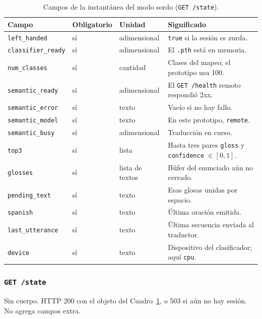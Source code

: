 \begin{table}[H]
  \centering
  \caption{Campos de la instantánea del modo sordo (\texttt{GET /state}).}
  \label{tab:api-local-snapshot}
  \small
  \begin{tabularx}{\textwidth}{@{}>{\raggedright\arraybackslash}p{3.4cm} l l >{\raggedright\arraybackslash}X@{}}
    \toprule
    \textbf{Campo} & \textbf{Obligatorio} & \textbf{Unidad} & \textbf{Significado} \\
    \midrule
    \texttt{left\_handed} & sí & adimensional & \texttt{true} si la sesión es zurda. \\
    \texttt{classifier\_ready} & sí & adimensional & El \texttt{.pth} está en memoria. \\
    \texttt{num\_classes} & sí & cantidad & Clases del mapeo; el prototipo usa 100. \\
    \texttt{semantic\_ready} & sí & adimensional & El \texttt{GET /health} remoto respondió 2xx. \\
    \texttt{semantic\_error} & sí & texto & Vacío si no hay fallo. \\
    \texttt{semantic\_model} & sí & texto & En este prototipo, \texttt{remote}. \\
    \texttt{semantic\_busy} & sí & adimensional & Traducción en curso. \\
    \texttt{top3} & sí & lista & Hasta tres pares \texttt{gloss} y \texttt{confidence} $\in [0, 1]$. \\
    \texttt{glosses} & sí & lista de textos & Búfer del enunciado aún no cerrado. \\
    \texttt{pending\_text} & sí & texto & Esas glosas unidas por espacio. \\
    \texttt{spanish} & sí & texto & Última oración emitida. \\
    \texttt{last\_utterance} & sí & texto & Última secuencia enviada al traductor. \\
    \texttt{device} & sí & texto & Dispositivo del clasificador; aquí \texttt{cpu}. \\
    \bottomrule
  \end{tabularx}
\end{table}

\subsubsection{\texttt{GET /state}}

Sin cuerpo. HTTP 200 con el objeto del Cuadro~\ref{tab:api-local-snapshot}, o 503 si aún no hay sesión. No agrega campos extra.

